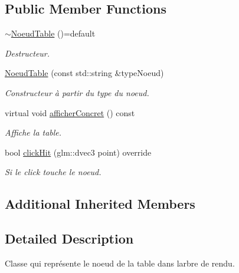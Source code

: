 \subsection*{Public Member Functions}
\begin{DoxyCompactItemize}
\item 
\hypertarget{class_noeud_table_a158d42536136842f7882c9694240d798}{}\hyperlink{class_noeud_table_a158d42536136842f7882c9694240d798}{$\sim$\+Noeud\+Table} ()=default\label{class_noeud_table_a158d42536136842f7882c9694240d798}

\begin{DoxyCompactList}\small\item\em Destructeur. \end{DoxyCompactList}\end{DoxyCompactItemize}
{\bf }\par
\begin{DoxyCompactItemize}
\item 
\hyperlink{class_noeud_table_a40983870720b331d17daeeb306e12ef5}{Noeud\+Table} (const std\+::string \&type\+Noeud)
\begin{DoxyCompactList}\small\item\em Constructeur à partir du type du noeud. \end{DoxyCompactList}\item 
virtual void \hyperlink{class_noeud_table_aa2876d070dd6fe57b0b90077fcd5036d}{afficher\+Concret} () const 
\begin{DoxyCompactList}\small\item\em Affiche la table. \end{DoxyCompactList}\item 
\hypertarget{class_noeud_table_a530697e3f64409dc8bb11fb6fa7c234c}{}bool \hyperlink{class_noeud_table_a530697e3f64409dc8bb11fb6fa7c234c}{click\+Hit} (glm\+::dvec3 point) override\label{class_noeud_table_a530697e3f64409dc8bb11fb6fa7c234c}

\begin{DoxyCompactList}\small\item\em Si le click touche le noeud. \end{DoxyCompactList}\end{DoxyCompactItemize}

\subsection*{Additional Inherited Members}


\subsection{Detailed Description}
Classe qui représente le noeud de la table dans l\textquotesingle{}arbre de rendu. 

